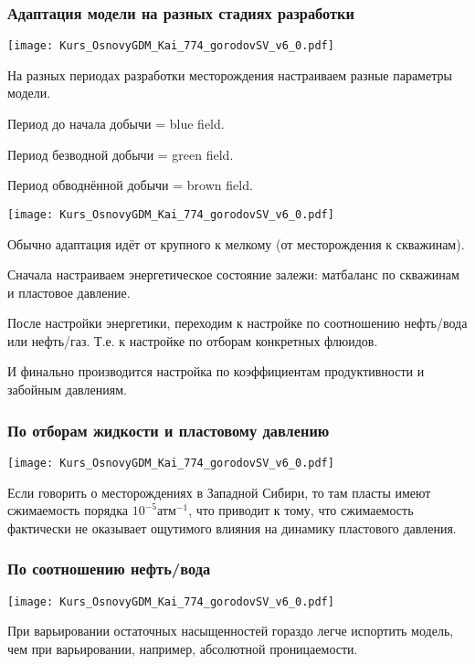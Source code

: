 \documentclass[main.tex]{subfiles}
\begin{document}
\subsubsection{Адаптация модели на разных стадиях разработки}

\texttt{[image: Kurs\_OsnovyGDM\_Kai\_774\_gorodovSV\_v6\_0.pdf]}

На разных периодах разработки месторождения настраиваем разные параметры модели.

Период до начала добычи = blue field.

Период безводной добычи = green field.

Период обводнённой добычи = brown field.

\texttt{[image: Kurs\_OsnovyGDM\_Kai\_774\_gorodovSV\_v6\_0.pdf]}

Обычно адаптация идёт от крупного к мелкому (от месторождения к скважинам).

Сначала настраиваем энергетическое состояние залежи: матбаланс по скважинам и пластовое давление.

После настройки энергетики, переходим к настройке по соотношению нефть/вода или нефть/газ.
Т.е. к настройке по отборам конкретных флюидов.

И финально производится настройка по коэффициентам продуктивности и забойным давлениям.

\subsubsection{По отборам жидкости и пластовому давлению}

\texttt{[image: Kurs\_OsnovyGDM\_Kai\_774\_gorodovSV\_v6\_0.pdf]}

Если говорить о месторождениях в Западной Сибири, то там пласты имеют сжимаемость порядка $10^{-5} \text{атм}^{-1}$, что приводит к тому, что сжимаемость фактически не оказывает ощутимого влияния на динамику пластового давления.

\subsubsection{По соотношению нефть/вода}

\texttt{[image: Kurs\_OsnovyGDM\_Kai\_774\_gorodovSV\_v6\_0.pdf]}

При варьировании остаточных насыщенностей гораздо легче испортить модель, чем при варьировании, например, абсолютной проницаемости.
\end{document}
